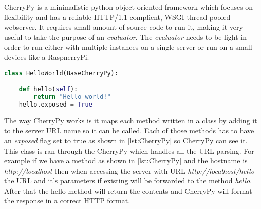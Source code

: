 CherryPy is a minimalistic python object-oriented framework which focuses on flexibility and has a reliable HTTP/1.1-complient, WSGI thread
pooled webserver. It requires small amount of source code to run it, making it very useful to take the purpose of an \textit{evaluator}. The \textit{evaluator}
needs to be light in order to run either with multiple instances on a single server or run on a small devices like a RaspnerryPi.

\begin{lstlisting}[language=Python,caption={Example CherryPy webservice that has the method "hello"},label={lst:CherryPy}]
class HelloWorld(BaseCherryPy):

    def hello(self):
        return "Hello world!"
    hello.exposed = True

	\end{lstlisting}
The way CherryPy works is it maps each method written in a class by adding it to the server URL name so it can be called. Each of those methods has to have
 an \textit{exposed} flag set to true as shown in \ref{lst:CherryPy} so CherryPy can see it. This class is ran through the CherryPy which handles
all the URL parsing. For example if we have a method as shown in \ref{lst:CherryPy} and the hostname is \textit{http://localhost} then when accessing the server
with URL \textit{http://localhost/hello} the URL and it's parameters if existing will be forwarded to the method \textit{hello}. After that the hello method
will return the contents and CherryPy will format the response in a correct HTTP format.
